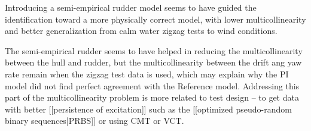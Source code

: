 Introducing a semi-empirical rudder model seems to have guided the identification toward a more physically correct model, with lower multicollinearity and better generalization from calm water zigzag tests to wind conditions.

The semi-empirical rudder seems to have helped in reducing the multicollinearity between the hull and rudder, but the multicollinearity between the drift ang yaw rate remain when the zigzag test data is used, which may explain why the PI model did not find perfect agreement with the Reference model. Addressing this part of the multicollinearity problem is more related to test design – to get data with better [[persistence of excitation]] such as the [[optimized pseudo-random binary sequences|PRBS]] or using CMT or VCT.